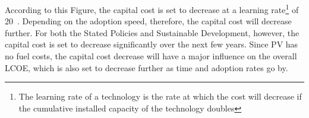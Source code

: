 \noindent
According to this Figure, the capital cost is set to decrease at a learning rate\footnote{The learning rate of a technology is the rate at which the cost will decrease if the cumulative installed capacity of the technology doubles} of 20\ . Depending on the adoption speed, therefore, the capital cost will decrease further. For both the Stated Policies and Sustainable Development, however, the capital cost is set to decrease significantly over the next few years. Since PV has no fuel costs, the capital cost decrease will have a major influence on the overall LCOE, which is also set to decrease further as time and adoption rates go by.  
 \newline \newline \noindent
